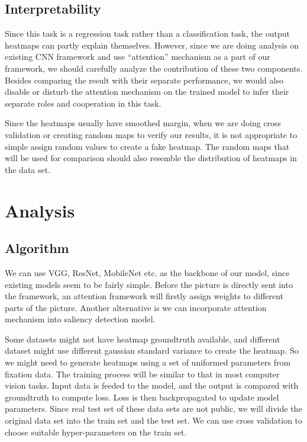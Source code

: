 \documentclass[12pt]{article}
\begin{document}
\subsection{Interpretability}

Since this task is a regression task rather than a classification task, the output heatmaps can partly explain themselves. 
However, since we are doing analysis on existing CNN framework and use “attention” mechanism as a part of our framework, we should carefully analyze the contribution of these two components. 
Besides comparing the result with their separate performance, we would also disable or disturb the attention mechanism on the trained model to infer their separate roles and cooperation in this task.

Since the heatmaps usually have smoothed margin, when we are doing cross validation or creating random maps to verify our results, it is not appropriate to simple assign random values to create a fake heatmap. 
The random maps that will be used for comparison should also resemble the distribution of heatmaps in the data set.

\section{Analysis}
\subsection{Algorithm}

We can use VGG, ResNet, MobileNet etc. as the backbone of our model, since existing models seem to be fairly simple. Before the picture is directly sent into the framework, an attention framework will firstly assign weights to different parts of the picture.
Another alternative is we can incorporate attention mechanism \cite{zhangSelfAttentionGenerativeAdversarial2019a} into saliency detection model.

Some datasets might not have heatmap groundtruth available, and different dataset might use different gaussian standard variance to create the heatmap.
So we might need to generate heatmaps using a set of uniformed parameters from fixation data.
The training process will be similar to that in most computer vision tasks. Input data is feeded to the model,
and the output is compared with groundtruth to compute loss. Loss is then backpropagated to update model parameters.
Since real test set of these data sets are not public, we will divide the original data set into the train set and the test set. We can use cross validation to choose suitable hyper-parameters on the train set.
\end{document}
